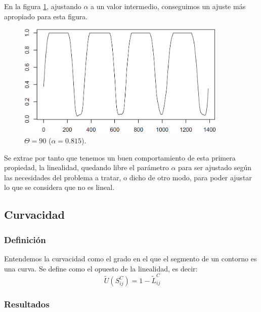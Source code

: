 En la figura \ref{fig8}, ajustando $\alpha$ a un valor intermedio, conseguimos un ajuste más apropiado para esta figura.\\

\begin{figure}[H]
\begin{center}

\includegraphics[width=0.9\textwidth]{img/lin-dev3-1-limpio-0815.png}
\end{center}

\caption{$\Theta = 90$ ($\alpha = 0.815$).}
\label{fig8}
\end{figure}

Se extrae por tanto que tenemos un buen comportamiento de esta primera propiedad, la linealidad, quedando libre el parámetro $\alpha$ para ser ajustado según las necesidades del problema a tratar, o dicho de otro modo, para poder ajustar lo que se considera que no es lineal.\\

\subsection{Curvacidad}


\subsubsection{Definición}

Entendemos la curvacidad como el grado en el que el segmento de un contorno es una curva. Se define como el opuesto de la linealidad, es decir:\\

\[
\ \tilde{U}(S^C_{ij}) = 1 - \tilde{L}^C_{ij}
\]
 
\subsubsection{Resultados}

